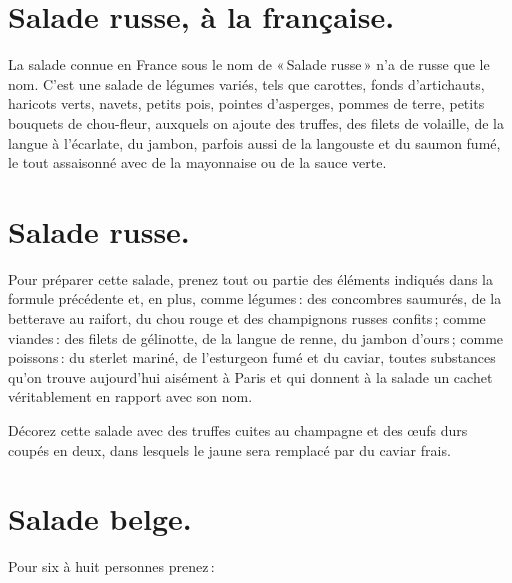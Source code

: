 \section*{\centering Salade russe, à la française.}
{}

La salade connue en France sous le nom de « Salade russe » n'a de russe que le
nom. C'est une salade de légumes variés, tels que carottes, fonds d'artichauts,
haricots verts, navets, petits pois, pointes d'asperges, pommes de terre,
petits bouquets de chou-fleur, auxquels on ajoute des truffes, des filets de
volaille, de la langue à l'écarlate, du jambon, parfois aussi de la langouste
et du saumon fumé, le tout assaisonné avec de la mayonnaise ou de la sauce
verte.

\section*{\centering Salade russe.}
{}

Pour préparer cette salade, prenez tout ou partie des éléments indiqués dans la
formule précédente et, en plus, comme légumes : des concombres saumurés, de la
betterave au raifort, du chou rouge et des champignons russes confits ; comme
viandes : des filets de gélinotte, de la langue de renne, du jambon d'ours ;
comme poissons : du sterlet mariné, de l’esturgeon fumé et du caviar, toutes
substances qu'on trouve aujourd'hui aisément à Paris et qui donnent à la salade
un cachet véritablement en rapport avec son nom.

Décorez cette salade avec des truffes cuites au champagne et des œufs durs
coupés en deux, dans lesquels le jaune sera remplacé par du caviar frais.

\section*{\centering Salade belge.}
{}

Pour six à huit personnes prenez :

